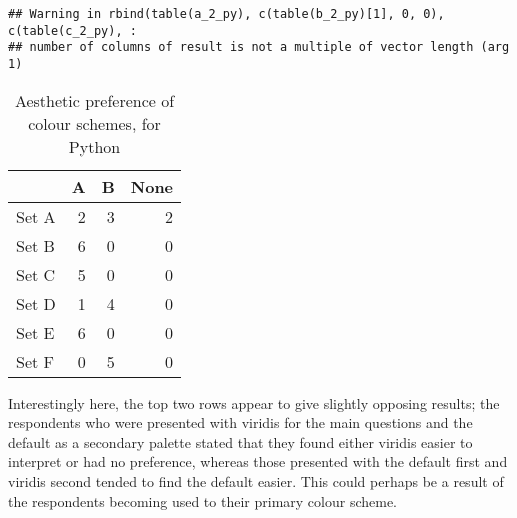 \documentclass[
]{article}
\newenvironment{Shaded}{\begin{snugshade}}{\end{snugshade}}
\newcommand{\DataTypeTok}[1]{\textcolor[rgb]{0.13,0.29,0.53}{#1}}
\newcommand{\KeywordTok}[1]{\textcolor[rgb]{0.13,0.29,0.53}{\textbf{#1}}}
\newcommand{\NormalTok}[1]{#1}
\newcommand{\OperatorTok}[1]{\textcolor[rgb]{0.81,0.36,0.00}{\textbf{#1}}}
\newcommand{\StringTok}[1]{\textcolor[rgb]{0.31,0.60,0.02}{#1}}
\begin{document}
\begin{verbatim}
## Warning in rbind(table(a_2_py), c(table(b_2_py)[1], 0, 0), c(table(c_2_py), :
## number of columns of result is not a multiple of vector length (arg 1)
\end{verbatim}

\begin{Shaded}
\end{Shaded}

\begin{table}[!h]

\caption{\label{tab:unnamed-chunk-52}Aesthetic preference of colour schemes, for Python}
\centering
\begin{tabular}[t]{l|r|r|r}
\hline
  & A & B & None\\
\hline
Set A & 2 & 3 & 2\\
\hline
Set B & 6 & 0 & 0\\
\hline
Set C & 5 & 0 & 0\\
\hline
Set D & 1 & 4 & 0\\
\hline
Set E & 6 & 0 & 0\\
\hline
Set F & 0 & 5 & 0\\
\hline
\end{tabular}
\end{table}

Interestingly here, the top two rows appear to give slightly opposing
results; the respondents who were presented with viridis for the main
questions and the default as a secondary palette stated that they found
either viridis easier to interpret or had no preference, whereas those
presented with the default first and viridis second tended to find the
default easier. This could perhaps be a result of the respondents
becoming used to their primary colour scheme.
\end{document}
